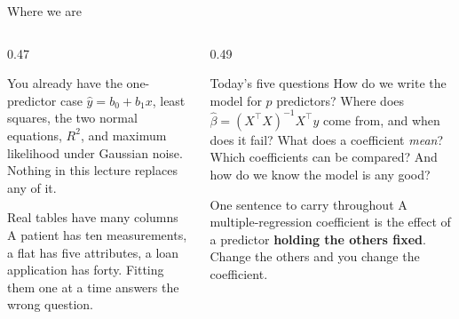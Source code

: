 \documentclass[aspectratio=169]{beamer}
\newcommand{\Xt}{X^{\!\top}}
\begin{document}
\begin{frame}[shrink=5]{Where we are}
  \begin{columns}[T]
    \begin{column}{0.47\textwidth}
      \begin{block}{You already have the one-predictor case}
        $\hat y = b_0 + b_1 x$, least squares, the two normal equations,
        $R^2$, and maximum likelihood under Gaussian noise. Nothing in this
        lecture replaces any of it.
      \end{block}
      \begin{block}{Real tables have many columns}
        A patient has ten measurements, a flat has five attributes, a loan
        application has forty. Fitting them one at a time answers the wrong
        question.
      \end{block}
    \end{column}
    \begin{column}{0.49\textwidth}
      \begin{exampleblock}{Today's five questions}
        How do we write the model for $p$ predictors? Where does
        $\hat\beta = (\Xt X)^{-1}\Xt y$ come from, and when does it fail?
        What does a coefficient \emph{mean}? Which coefficients can be
        compared? And how do we know the model is any good?
      \end{exampleblock}
      \begin{alertblock}{One sentence to carry throughout}
        \small A multiple-regression coefficient is the effect of a predictor
        \textbf{holding the others fixed}. Change the others and you change
        the coefficient.
      \end{alertblock}
    \end{column}
  \end{columns}
\end{frame}
\end{document}
